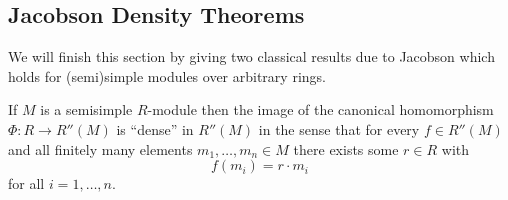 \subsection{Jacobson Density Theorems}
\label{subsection: Jacobson Density Theorems}


\begin{fluff}
  We will finish this section by giving two classical results due to Jacobson which holds for (semi)simple modules over arbitrary rings.
\end{fluff}


\begin{theorem}
  \label{theorem: first jacobson density theorem}
  If $M$ is a semisimple $R$-module then the image of the canonical homomorphism $\Phi \colon R \to R''(M)$ is \enquote{dense} in $R''(M)$ in the sense that for every $f \in R''(M)$ and all finitely many elements $m_1, \dotsc, m_n \in M$ there exists some $r \in R$ with
  \[
      f(m_i)
    = r \cdot m_i
  \]
  for all $i = 1, \dotsc, n$.
\end{theorem}


